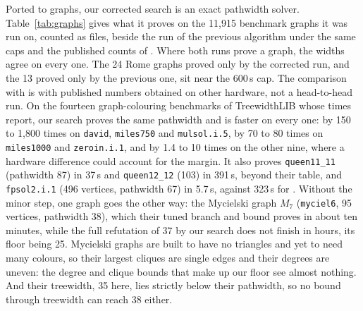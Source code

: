 Ported to graphs, our corrected search is an exact pathwidth solver. Table~\ref{tab:graphs} gives what it proves on the 11,915 benchmark graphs it was run on, counted as files, beside the run of the previous
algorithm under the same caps and the published counts of
\citet{CoudertMazauricNisse2016}. Where both runs prove a graph, the widths
agree on every one. The 24 Rome graphs proved only by the corrected run, and the
13 proved only by the previous one, sit near the 600\,s cap. The comparison with
\citet{CoudertMazauricNisse2016} is with published numbers obtained on other
hardware, not a head-to-head run. On the fourteen graph-colouring benchmarks of TreewidthLIB whose times
\citet[Table~4]{CoudertMazauricNisse2016} report, our search proves the same
pathwidth and is faster on every one: by 150 to 1,800 times on \texttt{david},
\texttt{miles750} and \texttt{mulsol.i.5}, by 70 to 80 times on
\texttt{miles1000} and \texttt{zeroin.i.1}, and by 1.4 to 10 times on the
other nine, where a hardware difference could account for the margin. It also
proves \texttt{queen11\_11} (pathwidth 87) in 37\,s and \texttt{queen12\_12}
(103) in 391\,s, beyond their table, and \texttt{fpsol2.i.1} (496 vertices,
pathwidth 67) in 5.7\,s, against 323\,s for
\citet{KobayashiKomuroTamaki2014}. Without the minor step, one graph goes the other way: the Mycielski graph
$M_7$ (\texttt{myciel6}, 95 vertices, pathwidth 38), which their tuned branch
and bound proves in about ten minutes, while the full refutation of 37 by our
search does not finish in hours, its floor being 25. Mycielski graphs are
built to have no triangles and yet to need many colours, so their largest
cliques are single edges and their degrees are uneven: the degree and clique
bounds that make up our floor see almost nothing. And their treewidth, 35 here, lies strictly below their pathwidth, so no
bound through treewidth can reach 38 either.

